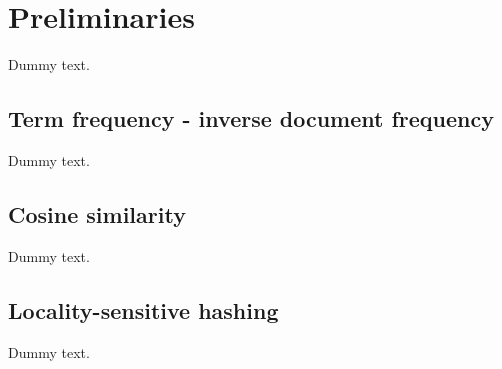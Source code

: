 \chapter{Preliminaries}

Dummy text.

\section{Term frequency - inverse document frequency}

Dummy text.

\section{Cosine similarity}

Dummy text.

\section{Locality-sensitive hashing}

Dummy text.

